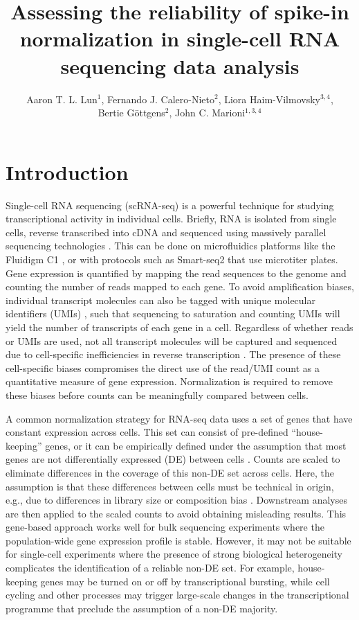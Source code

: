 \documentclass{article}
\title{Assessing the reliability of spike-in normalization in single-cell RNA sequencing data analysis}
\author{Aaron T. L. Lun$^1$, Fernando J. Calero-Nieto$^2$, Liora Haim-Vilmovsky$^{3,4}$, \\ Bertie G\"ottgens$^2$, John C. Marioni$^{1,3,4}$}
\date{
    \begin{minipage}{0.9\textwidth}
        \begin{flushleft} 
            \begin{small}
                $^1$Cancer Research UK Cambridge Institute, University of Cambridge, Li Ka Shing Centre, Robinson Way, Cambridge CB2 0RE, United Kingdom \\
                $^2$Cambridge Institute for Medical Research,  University of Cambridge, Wellcome Trust/MRC Building, Hills Road, Cambridge CB2 0XY, United Kingdom \\
                $^3$EMBL European Bioinformatics Institute, Wellcome Genome Campus, Hinxton, Cambridge CB10 1SD, United Kingdom \\
                $^4$Wellcome Trust Sanger Institute, Wellcome Genome Campus, Hinxton, Cambridge CB10 1SA, United Kingdom \\
            \end{small}
        \end{flushleft}
    \end{minipage}\\[0.2in]
    \today{}
}
\begin{document}
\maketitle

\section{Introduction}
Single-cell RNA sequencing (scRNA-seq) is a powerful technique for studying transcriptional activity in individual cells.
Briefly, RNA is isolated from single cells, reverse transcribed into cDNA and sequenced using massively parallel sequencing technologies \cite{shapiro2013singlecell}.
This can be done on microfluidics platforms like the Fluidigm C1 \cite{pollen2014lowcoverage}, or with protocols such as Smart-seq2 \cite{picelli2014full} that use microtiter plates.
Gene expression is quantified by mapping the read sequences to the genome and counting the number of reads mapped to each gene.
To avoid amplification biases, individual transcript molecules can also be tagged with unique molecular identifiers (UMIs) \cite{islam2014quantitative}, such that sequencing to saturation and counting UMIs will yield the number of transcripts of each gene in a cell.
Regardless of whether reads or UMIs are used, not all transcript molecules will be captured and sequenced due to cell-specific inefficiencies in reverse transcription \cite{stegle2015computational}.
The presence of these cell-specific biases compromises the direct use of the read/UMI count as a quantitative measure of gene expression.
Normalization is required to remove these biases before counts can be meaningfully compared between cells.

A common normalization strategy for RNA-seq data uses a set of genes that have constant expression across cells.
This set can consist of pre-defined ``house-keeping'' genes, or it can be empirically defined under the assumption that most genes are not differentially expressed (DE) between cells \cite{lun2016pooling,anders2010differential,robinson2010tmm}.
Counts are scaled to eliminate differences in the coverage of this non-DE set across cells.
Here, the assumption is that these differences between cells must be technical in origin, e.g., due to differences in library size or composition bias \cite{robinson2010tmm}.
Downstream analyses are then applied to the scaled counts to avoid obtaining misleading results.
This gene-based approach works well for bulk sequencing experiments where the population-wide gene expression profile is stable.
However, it may not be suitable for single-cell experiments where the presence of strong biological heterogeneity complicates the identification of a reliable non-DE set. 
For example, house-keeping genes may be turned on or off by transcriptional bursting, while cell cycling and other processes may trigger large-scale changes in the transcriptional programme that preclude the assumption of a non-DE majority.
\end{document}
